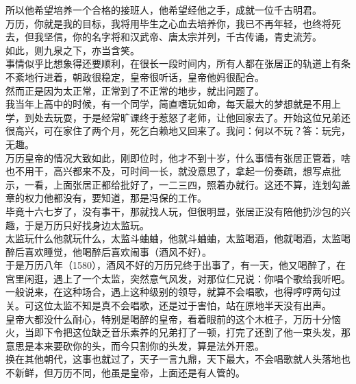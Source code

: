\begin{multicols}{\theparacolNo}
所以他希望培养一个合格的接班人，他希望经他之手，成就一位千古明君。\\

万历，你就是我的目标，我将用毕生之心血去培养你，我已不再年轻，也终将死去，但我坚信，你的名字将和汉武帝、唐太宗并列，千古传诵，青史流芳。\\

如此，则九泉之下，亦当含笑。\\

事情似乎比想象得还要顺利，在很长一段时间内，所有人都在张居正的轨道上有条不紊地行进着，朝政很稳定，皇帝很听话，皇帝他妈很配合。\\

然而正是因为太正常，正常到了不正常的地步，就出问题了。\\

我当年上高中的时候，有一个同学，简直嗜玩如命，每天最大的梦想就是不用上学，到处去玩耍，于是经常旷课终于惹怒了老师，让他回家去了。开始这位兄弟还很高兴，可在家住了两个月，死乞白赖地又回来了。我问：何以不玩？答：玩完，无趣。\\

万历皇帝的情况大致如此，刚即位时，他才不到十岁，什么事情有张居正管着，啥也不用干，高兴都来不及，可时间一长，就没意思了，拿起一份奏疏，想写点批示，一看，上面张居正都给批好了，一二三四，照着办就行。这还不算，连划勾盖章的权力他都没有，要知道，那是冯保的工作。\\

毕竟十六七岁了，没有事干，那就找人玩，但很明显，张居正没有陪他扔沙包的兴趣，于是万历只好找身边太监玩。\\

太监玩什么他就玩什么，太监斗蛐蛐，他就斗蛐蛐，太监喝酒，他就喝酒，太监喝醉后喜欢睡觉，他喝醉后喜欢闹事（酒风不好）。\\

于是万历八年（1580），酒风不好的万历兄终于出事了，有一天，他又喝醉了，在宫里闲逛，遇上了一个太监，突然意气风发，对那位仁兄说：你唱个歌给我听吧。\\

一般说来，在这种场合，遇上这种级别的领导，就算不会唱歌，也得哼哼两句过关。可这位太监不知是真不会唱歌，还是过于害怕，站在原地半天没有出声。\\

皇帝大都没什么耐心，特别是喝醉的皇帝，看着眼前的这个木桩子，万历十分恼火，当即下令把这位缺乏音乐素养的兄弟打了一顿，打完了还割了他一束头发，那意思是本来要砍你的头，而今只割你的头发，算是法外开恩。\\

换在其他朝代，这事也就过了，天子一言九鼎，天下最大，不会唱歌就人头落地也不新鲜，但万历不同，他虽是皇帝，上面还是有人管的。\\


\end{multicols}
